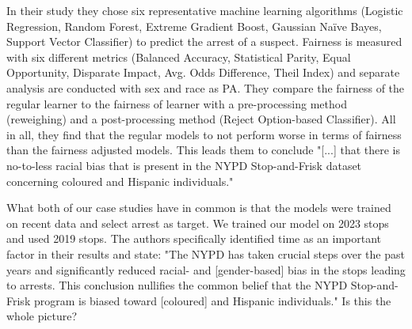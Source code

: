 In their study they chose six representative machine learning algorithms (Logistic Regression, Random Forest, Extreme Gradient Boost, Gaussian Naïve Bayes, Support Vector Classifier) to predict the arrest of a suspect. Fairness is measured with six different metrics (Balanced Accuracy, Statistical Parity, Equal Opportunity, Disparate Impact, Avg. Odds Difference, Theil Index) and separate analysis are conducted with sex and race as PA.
They compare the fairness of the regular learner to the fairness of learner with a pre-processing method (reweighing) and a post-processing method (Reject Option-based Classifier).
All in all, they find that the regular models to not perform worse in terms of fairness than the fairness adjusted models. This leads them to conclude "[...] that there is no-to-less racial bias that is present in the NYPD Stop-and-Frisk dataset concerning coloured and Hispanic individuals."\par
What both of our case studies have in common is that the models were trained on recent data and select arrest as target. We trained our model on 2023 stops and \cite{Badr2022DTFANSP} used 2019 stops. The authors specifically identified time as an important factor in their results and state: "The NYPD has taken crucial steps over the past years and significantly reduced racial- and [gender-based] bias in the stops leading to arrests. This conclusion nullifies the common belief that the NYPD Stop-and-Frisk program is biased toward [coloured] and Hispanic individuals." Is this the whole picture?



  


